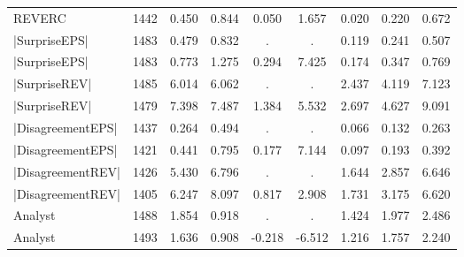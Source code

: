 \begin{tabular}{l*{8}{c}}
REVERC      &        1442&       0.450&       0.844&       0.050&       1.657&       0.020&       0.220&       0.672\\
|SurpriseEPS|&        1483&       0.479&       0.832&           .&           .&       0.119&       0.241&       0.507\\
|SurpriseEPS|&        1483&       0.773&       1.275&       0.294&       7.425&       0.174&       0.347&       0.769\\
|SurpriseREV|&        1485&       6.014&       6.062&           .&           .&       2.437&       4.119&       7.123\\
|SurpriseREV|&        1479&       7.398&       7.487&       1.384&       5.532&       2.697&       4.627&       9.091\\
|DisagreementEPS|&        1437&       0.264&       0.494&           .&           .&       0.066&       0.132&       0.263\\
|DisagreementEPS|&        1421&       0.441&       0.795&       0.177&       7.144&       0.097&       0.193&       0.392\\
|DisagreementREV|&        1426&       5.430&       6.796&           .&           .&       1.644&       2.857&       6.646\\
|DisagreementREV|&        1405&       6.247&       8.097&       0.817&       2.908&       1.731&       3.175&       6.620\\
Analyst     &        1488&       1.854&       0.918&           .&           .&       1.424&       1.977&       2.486\\
Analyst     &        1493&       1.636&       0.908&      -0.218&      -6.512&       1.216&       1.757&       2.240\\
\bottomrule
\end{tabular}

